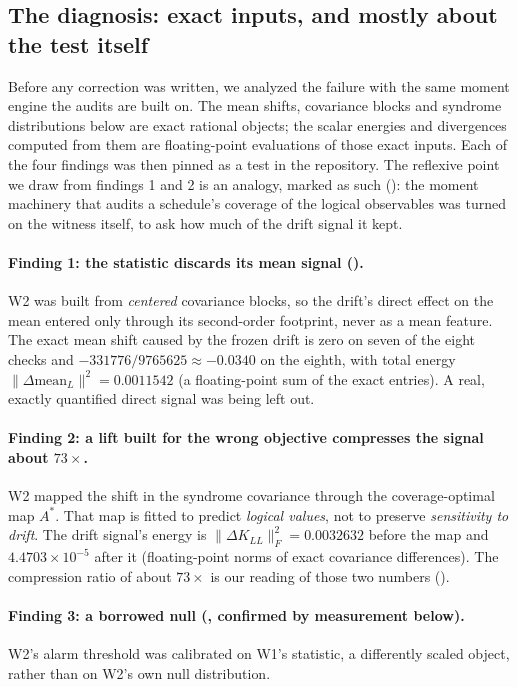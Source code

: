 \subsection{The diagnosis: exact inputs, and mostly about the test itself}
\label{sec:diagnosis}

Before any correction was written, we analyzed the failure with the same moment engine the audits are built on. The mean shifts, covariance blocks and syndrome distributions below are exact rational objects; the scalar energies and divergences computed from them are floating-point evaluations of those exact inputs. Each of the four findings was then pinned as a test in the repository. The reflexive point we draw from findings 1 and 2 is an analogy, marked as such (\gInterp): the moment machinery that audits a schedule's coverage of the logical observables was turned on the witness itself, to ask how much of the drift signal it kept.

\paragraph{Finding 1: the statistic discards its mean signal (\gExact).} W2 was built from \emph{centered} covariance blocks, so the drift's direct effect on the mean entered only through its second-order footprint, never as a mean feature. The exact mean shift caused by the frozen drift is zero on seven of the eight checks and $-331776/9765625 \approx -0.0340$ on the eighth, with total energy $\|\Delta\mathrm{mean}_L\|^{2} = 0.0011542$ (a floating-point sum of the exact entries). %
A real, exactly quantified direct signal was being left out.

\paragraph{Finding 2: a lift built for the wrong objective compresses the signal about $73\times$.} W2 mapped the shift in the syndrome covariance through the coverage-optimal map $A^{*}$. That map is fitted to predict \emph{logical values}, not to preserve \emph{sensitivity to drift}. The drift signal's energy is $\|\Delta K_{LL}\|_F^{2} = 0.0032632$ before the map and $4.4703 \times 10^{-5}$ after it (floating-point norms of exact covariance differences). %
The compression ratio of about $73\times$ is our reading of those two numbers (\gInterp).

\paragraph{Finding 3: a borrowed null (\gInterp, confirmed by measurement below).} W2's alarm threshold was calibrated on W1's statistic, a differently scaled object, rather than on W2's own null distribution. %

